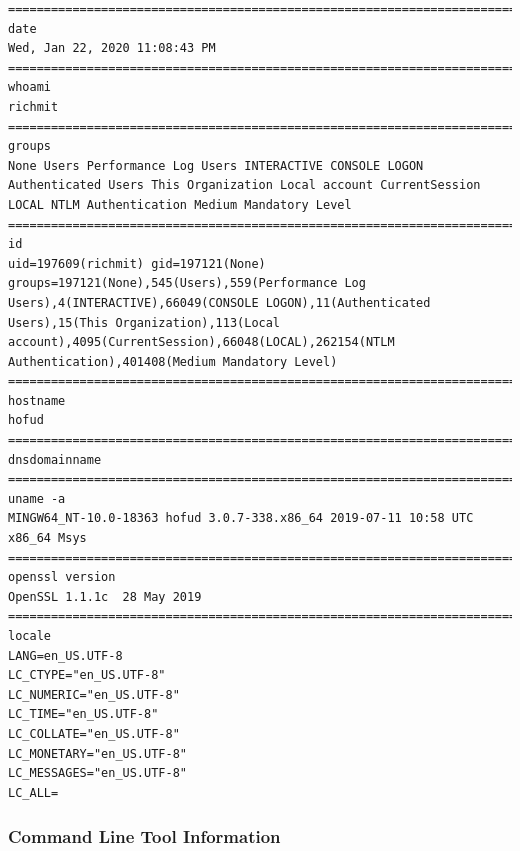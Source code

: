 \documentclass[11pt]{article}
\begin{document}
\begin{verbatim}
==========================================================================================
date
Wed, Jan 22, 2020 11:08:43 PM
==========================================================================================
whoami
richmit
==========================================================================================
groups
None Users Performance Log Users INTERACTIVE CONSOLE LOGON Authenticated Users This Organization Local account CurrentSession LOCAL NTLM Authentication Medium Mandatory Level
==========================================================================================
id
uid=197609(richmit) gid=197121(None) groups=197121(None),545(Users),559(Performance Log Users),4(INTERACTIVE),66049(CONSOLE LOGON),11(Authenticated Users),15(This Organization),113(Local account),4095(CurrentSession),66048(LOCAL),262154(NTLM Authentication),401408(Medium Mandatory Level)
==========================================================================================
hostname
hofud
==========================================================================================
dnsdomainname
==========================================================================================
uname -a
MINGW64_NT-10.0-18363 hofud 3.0.7-338.x86_64 2019-07-11 10:58 UTC x86_64 Msys
==========================================================================================
openssl version
OpenSSL 1.1.1c  28 May 2019
==========================================================================================
locale
LANG=en_US.UTF-8
LC_CTYPE="en_US.UTF-8"
LC_NUMERIC="en_US.UTF-8"
LC_TIME="en_US.UTF-8"
LC_COLLATE="en_US.UTF-8"
LC_MONETARY="en_US.UTF-8"
LC_MESSAGES="en_US.UTF-8"
LC_ALL=
\end{verbatim}

\subsubsection{Command Line Tool Information}
\label{sec:org4444219}
\end{document}
